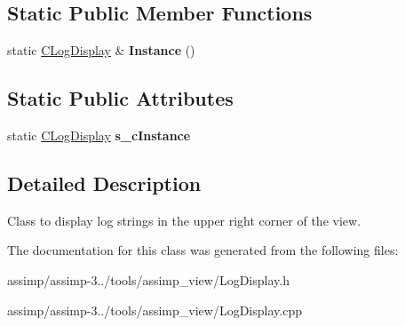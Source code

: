 \subsection*{Static Public Member Functions}
\begin{DoxyCompactItemize}
\item 
\hypertarget{class_c_log_display_a5223bba53fb54d34e92f90f073d93eb3}{static \hyperlink{class_c_log_display}{C\+Log\+Display} \& {\bfseries Instance} ()}\label{class_c_log_display_a5223bba53fb54d34e92f90f073d93eb3}

\end{DoxyCompactItemize}
\subsection*{Static Public Attributes}
\begin{DoxyCompactItemize}
\item 
\hypertarget{class_c_log_display_ac60897d4650af01b3da1c030706a73ff}{static \hyperlink{class_c_log_display}{C\+Log\+Display} {\bfseries s\+\_\+c\+Instance}}\label{class_c_log_display_ac60897d4650af01b3da1c030706a73ff}

\end{DoxyCompactItemize}


\subsection{Detailed Description}
Class to display log strings in the upper right corner of the view. 

The documentation for this class was generated from the following files\+:\begin{DoxyCompactItemize}
\item 
assimp/assimp-\/3../tools/assimp\+\_\+view/Log\+Display.\+h\item 
assimp/assimp-\/3../tools/assimp\+\_\+view/Log\+Display.\+cpp\end{DoxyCompactItemize}
